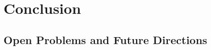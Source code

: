 \chapter{Conclusion}
\label{chap:conclusion}



\section{Open Problems and Future Directions}
\label{sec:open_problems}